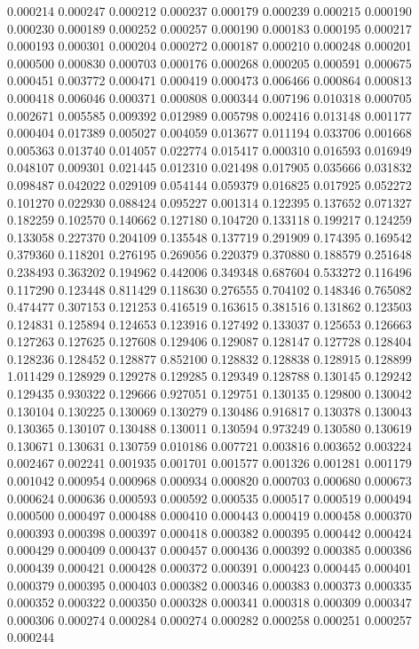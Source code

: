 0.000214
0.000247
0.000212
0.000237
0.000179
0.000239
0.000215
0.000190
0.000230
0.000189
0.000252
0.000257
0.000190
0.000183
0.000195
0.000217
0.000193
0.000301
0.000204
0.000272
0.000187
0.000210
0.000248
0.000201
0.000500
0.000830
0.000703
0.000176
0.000268
0.000205
0.000591
0.000675
0.000451
0.003772
0.000471
0.000419
0.000473
0.006466
0.000864
0.000813
0.000418
0.006046
0.000371
0.000808
0.000344
0.007196
0.010318
0.000705
0.002671
0.005585
0.009392
0.012989
0.005798
0.002416
0.013148
0.001177
0.000404
0.017389
0.005027
0.004059
0.013677
0.011194
0.033706
0.001668
0.005363
0.013740
0.014057
0.022774
0.015417
0.000310
0.016593
0.016949
0.048107
0.009301
0.021445
0.012310
0.021498
0.017905
0.035666
0.031832
0.098487
0.042022
0.029109
0.054144
0.059379
0.016825
0.017925
0.052272
0.101270
0.022930
0.088424
0.095227
0.001314
0.122395
0.137652
0.071327
0.182259
0.102570
0.140662
0.127180
0.104720
0.133118
0.199217
0.124259
0.133058
0.227370
0.204109
0.135548
0.137719
0.291909
0.174395
0.169542
0.379360
0.118201
0.276195
0.269056
0.220379
0.370880
0.188579
0.251648
0.238493
0.363202
0.194962
0.442006
0.349348
0.687604
0.533272
0.116496
0.117290
0.123448
0.811429
0.118630
0.276555
0.704102
0.148346
0.765082
0.474477
0.307153
0.121253
0.416519
0.163615
0.381516
0.131862
0.123503
0.124831
0.125894
0.124653
0.123916
0.127492
0.133037
0.125653
0.126663
0.127263
0.127625
0.127608
0.129406
0.129087
0.128147
0.127728
0.128404
0.128236
0.128452
0.128877
0.852100
0.128832
0.128838
0.128915
0.128899
1.011429
0.128929
0.129278
0.129285
0.129349
0.128788
0.130145
0.129242
0.129435
0.930322
0.129666
0.927051
0.129751
0.130135
0.129800
0.130042
0.130104
0.130225
0.130069
0.130279
0.130486
0.916817
0.130378
0.130043
0.130365
0.130107
0.130488
0.130011
0.130594
0.973249
0.130580
0.130619
0.130671
0.130631
0.130759
0.010186
0.007721
0.003816
0.003652
0.003224
0.002467
0.002241
0.001935
0.001701
0.001577
0.001326
0.001281
0.001179
0.001042
0.000954
0.000968
0.000934
0.000820
0.000703
0.000680
0.000673
0.000624
0.000636
0.000593
0.000592
0.000535
0.000517
0.000519
0.000494
0.000500
0.000497
0.000488
0.000410
0.000443
0.000419
0.000458
0.000370
0.000393
0.000398
0.000397
0.000418
0.000382
0.000395
0.000442
0.000424
0.000429
0.000409
0.000437
0.000457
0.000436
0.000392
0.000385
0.000386
0.000439
0.000421
0.000428
0.000372
0.000391
0.000423
0.000445
0.000401
0.000379
0.000395
0.000403
0.000382
0.000346
0.000383
0.000373
0.000335
0.000352
0.000322
0.000350
0.000328
0.000341
0.000318
0.000309
0.000347
0.000306
0.000274
0.000284
0.000274
0.000282
0.000258
0.000251
0.000257
0.000244
